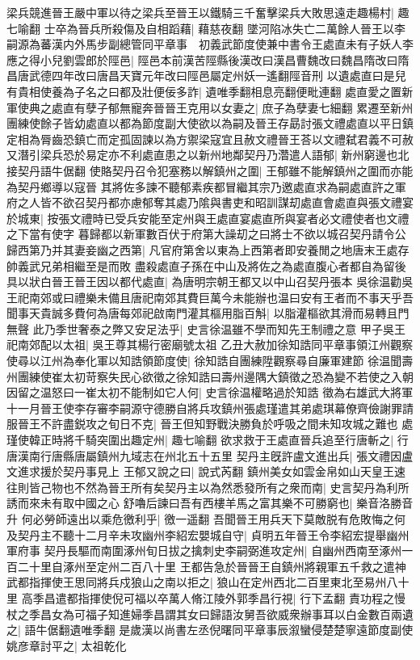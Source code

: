 梁兵競進晉王嚴中軍以待之梁兵至晉王以鐵騎三千奮擊梁兵大敗思遠走趣楊村|{
	趣七喻翻}
士卒為晉兵所殺傷及自相蹈藉|{
	藉慈夜翻}
墜河陷冰失亡二萬餘人晉王以李嗣源為蕃漢内外馬步副總管同平章事　初義武節度使兼中書令王處直未有子妖人李應之得小兒劉雲郎於陘邑|{
	陘邑本前漢苦陘縣後漢改曰漢昌曹魏改曰魏昌隋改曰隋昌唐武德四年改曰唐昌天寶元年改曰陘邑屬定州妖一遙翻陘音刑}
以遺處直曰是兒有貴相使養為子名之曰都及壯便佞多詐|{
	遺唯季翻相息亮翻便毗連翻}
處直愛之置新軍使典之處直有孽子郁無寵奔晉晉王克用以女妻之|{
	庶子為孽妻七細翻}
累遷至新州團練使餘子皆幼處直以都為節度副大使欲以為嗣及晉王存勗討張文禮處直以平日鎮定相為脣齒恐鎮亡而定孤固諫以為方禦梁寇宜且赦文禮晉王荅以文禮弑君義不可赦又潛引梁兵恐於易定亦不利處直患之以新州地鄰契丹乃濳遣人語郁|{
	新州窮邊也北接契丹語牛倨翻}
使賂契丹召令犯塞務以解鎮州之圍|{
	王郁雖不能解鎮州之圍而亦能為契丹鄉導以寇晉}
其將佐多諫不聽郁素疾都冒繼其宗乃邀處直求為嗣處直許之軍府之人皆不欲召契丹都亦慮郁奪其處乃隂與書吏和昭訓謀刧處直會處直與張文禮宴於城東|{
	按張文禮時已受兵安能至定州與王處直宴處直所與宴者必文禮使者也文禮之下當有使字}
暮歸都以新軍數百伏于府第大譟刧之曰將士不欲以城召契丹請令公歸西第乃并其妻妾幽之西第|{
	凡官府第舍以東為上西第者即安養閒之地唐末王處存帥義武兄弟相繼至是而敗}
盡殺處直子孫在中山及將佐之為處直腹心者都自為留後具以狀白晉王晉王因以都代處直|{
	為唐明宗朝王都又以中山召契丹張本}
吳徐温勸吳王祀南郊或曰禮樂未備且唐祀南郊其費巨萬今未能辦也温曰安有王者而不事天乎吾聞事天貴誠多費何為唐每郊祀啟南門灌其樞用脂百斛|{
	以脂灌樞欲其滑而易轉且門無聲}
此乃季世奢泰之弊又安足法乎|{
	史言徐温雖不學而知先王制禮之意}
甲子吳王祀南郊配以太祖|{
	吳王尊其楊行密廟號太祖}
乙丑大赦加徐知誥同平章事領江州觀察使尋以江州為奉化軍以知誥領節度使|{
	徐知誥自團練陞觀察尋自廉軍建節}
徐温聞壽州團練使崔太初苛察失民心欲徵之徐知誥曰壽州邊隅大鎮徵之恐為變不若使之入朝因留之温怒曰一崔太初不能制如它人何|{
	史言徐温權略過於知誥}
徵為右雄武大將軍　十一月晉王使李存審李嗣源守德勝自將兵攻鎮州張處瑾遣其弟處琪幕僚齊儉謝罪請服晉王不許盡鋭攻之旬日不克|{
	晉王但知野戰決勝負於呼吸之間未知攻城之難也}
處瑾使韓正時將千騎突圍出趣定州|{
	趣七喻翻}
欲求救于王處直晉兵追至行唐斬之|{
	行唐漢南行唐縣唐屬鎮州九域志在州北五十五里}
契丹主旣許盧文進出兵|{
	張文禮因盧文進求援於契丹事見上}
王郁又說之曰|{
	說式芮翻}
鎮州美女如雲金帛如山天皇王速往則皆己物也不然為晉王所有矣契丹主以為然悉發所有之衆而南|{
	史言契丹為利所誘而來未有取中國之心}
舒嚕后諫曰吾有西樓羊馬之富其樂不可勝窮也|{
	樂音洛勝音升}
何必勞師遠出以乘危徼利乎|{
	徼一遥翻}
吾聞晉王用兵天下莫敵脱有危敗悔之何及契丹主不聽十二月辛未攻幽州李紹宏嬰城自守|{
	貞明五年晉王令李紹宏提舉幽州軍府事}
契丹長驅而南圍涿州旬日拔之擒刺史李嗣弼進攻定州|{
	自幽州西南至涿州一百二十里自涿州至定州二百八十里}
王都告急於晉晉王自鎮州將親軍五千救之遣神武都指揮使王思同將兵戍狼山之南以拒之|{
	狼山在定州西北二百里東北至易州八十里}
高季昌遣都指揮使倪可福以卒萬人脩江陵外郭季昌行視|{
	行下孟翻}
責功程之慢杖之季昌女為可福子知進婦季昌謂其女曰歸語汝舅吾欲威衆辦事耳以白金數百兩遺之|{
	語牛倨翻遺唯季翻}
是歲漢以尚書左丞倪曙同平章事辰溆蠻侵楚楚寧遠節度副使姚彦章討平之|{
	太祖乾化}



